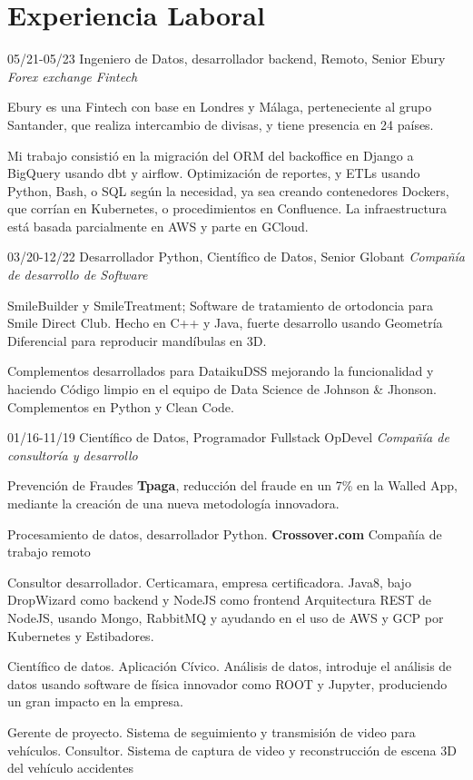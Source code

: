 \section{Experiencia Laboral}

\begin{entrylist}
  \entry
    {05/21-05/23}       
    {Ingeniero de Datos, desarrollador backend, Remoto, Senior}
    {Ebury {\sl Forex exchange Fintech}}
    {Ebury es una Fintech con base en Londres y Málaga, perteneciente al grupo Santander, que realiza intercambio
de divisas, y tiene presencia en 24 países.

     Mi trabajo consistió en la migración del ORM del backoffice en Django a BigQuery usando dbt y airflow. Optimización de reportes, y ETLs usando Python, Bash, o SQL según la necesidad, ya sea creando contenedores Dockers, que corrían en Kubernetes, o procedimientos en Confluence. La infraestructura está basada parcialmente en AWS y parte en GCloud.}
  \entry
    {03/20-12/22}
    {Desarrollador Python, Científico de Datos, Senior}
    {Globant {\sl Compañía de desarrollo de Software}}
	{SmileBuilder y SmileTreatment; Software de tratamiento de ortodoncia para Smile Direct Club. Hecho en C++ y Java,
fuerte desarrollo usando Geometría Diferencial para reproducir mandíbulas en 3D.

Complementos desarrollados para DataikuDSS mejorando la funcionalidad y haciendo
Código limpio en el equipo de Data Science de Johnson \& Jhonson. Complementos en Python y Clean Code.}
  \entry
    {01/16-11/19}
    {Científico de Datos, Programador Fullstack}
    {OpDevel {\sl Compañía de consultoría y desarrollo}}
    {Prevención de Fraudes \textbf{Tpaga}, reducción del fraude en un 7\% en la Walled App, mediante la
creación de una nueva metodología innovadora.

Procesamiento de datos, desarrollador Python. \textbf{Crossover.com} Compañía de trabajo remoto

Consultor desarrollador. Certicamara, empresa certificadora. Java8, bajo
DropWizard como backend y NodeJS como frontend Arquitectura REST de NodeJS,
usando Mongo, RabbitMQ y ayudando en el uso de AWS y GCP por Kubernetes
y Estibadores.

Científico de datos. Aplicación Cívico. Análisis de datos, introduje el análisis de datos usando
software de física innovador como ROOT y Jupyter, produciendo un gran impacto en
la empresa.

Gerente de proyecto. Sistema de seguimiento y transmisión de video para vehículos.
Consultor. Sistema de captura de video y reconstrucción de escena 3D del vehículo
accidentes

}
\end{entrylist}

